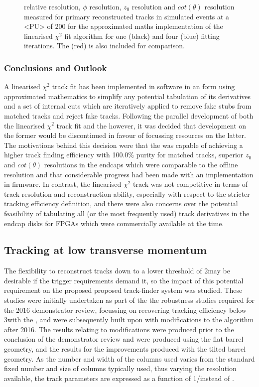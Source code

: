\begin{figure}[htb]
\caption{
\pt relative resolution, $\phi$ resolution, $z_{0}$ resolution and $cot(\theta)$ resolution measured for primary reconstructed tracks in simulated \ttbar events at a <PU> of 200 for the approximated maths implementation of the linearised $\chi^{2}$ fit algorithm for one (black) and four (blue) fitting iterations. The \KF (red) is also included for comparison.
}
\label{fig:chi2HelixParametersResIterationsComparison}
\end{figure}

\subsubsection{Conclusions and Outlook}\label{subsubsec:chi2outlook}
A linearised $\chi^{2}$ track fit has been implemented in software in an form using approximated mathematics to simplify any potential tabulation of its derivatives and a set of internal cuts which are iteratively applied to remove fake stubs from matched tracks and reject fake tracks.
Following the parallel development of both the linearised $\chi^{2}$ track fit and the \KF however, it was decided that development on the former would be discontinued in favour of focussing resources on the latter.
The motivations behind this decision were that the \KF was capable of achieving a higher track finding efficiency with 100.0\% purity for matched tracks, superior $z_{0}$ and $cot(\theta)$ resolutions in the endcaps which were comparable to the offline resolution and that considerable progress had been made with an implementation in firmware.
In contrast, the linearised $\chi^{2}$ track was not competitive in terms of track resolution and reconstruction ability, especially with respect to the stricter tracking efficiency definition, and there were also concerns over the potential feasibility of tabulating all (or the most frequently used) track derivatives in the endcap disks for FPGAs which were commercially available at the time.

\subsection{Tracking at low transverse momentum}\label{subsec:Tmtt2GeV}
The flexibility to reconstruct tracks down to a lower \pT threshold of 2\GeV may be desirable if the trigger requirements demand it, so the impact of this potential requirement on the proposed proposed track-finder system was studied.
These studies were initially undertaken as part of the the robustness studies required for the 2016 demonstrator review, focussing on recovering tracking efficiency below 3\GeV with the \HT, and were subsequently built upon with modifications to the \KF algorithm after 2016.
The results relating to \HT modifications were produced prior to the conclusion of the demonstrator review and were produced using the flat barrel geometry, and the results for the \KF improvements produced with the tilted barrel geometry.
As the number and width of the \qpt \HT columns used varies from the standard fixed number and size of columns typically used, thus varying the \pT resolution available, the track parameters are expressed as a function of 1/\pT instead of \pT.

